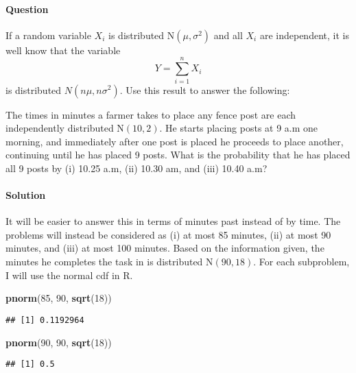 \documentclass[]{article}
\newenvironment{Shaded}{\begin{snugshade}}{\end{snugshade}}
\newcommand{\KeywordTok}[1]{\textcolor[rgb]{0.13,0.29,0.53}{\textbf{#1}}}
\newcommand{\DecValTok}[1]{\textcolor[rgb]{0.00,0.00,0.81}{#1}}
\newcommand{\NormalTok}[1]{#1}
\let\oldparagraph\paragraph
\renewcommand{\paragraph}[1]{\oldparagraph{#1}\mbox{}}
\begin{document}
\paragraph{Question}\label{question-5}

If a random variable \(X_i\) is distributed N\((\mu, \sigma^2)\) and all
\(X_i\) are independent, it is well know that the variable \[
        Y = \sum^n_{i=1}X_i
    \] is distributed \(N(n\mu, n\sigma^2).\) Use this result to answer
the following:

The times in minutes a farmer takes to place any fence post are each
independently distributed N\((10,2)\). He starts placing posts at 9 a.m
one morning, and immediately after one post is placed he proceeds to
place another, continuing until he has placed 9 posts. What is the
probability that he has placed all 9 posts by (i) 10.25 a.m, (ii) 10.30
am, and (iii) 10.40 a.m?

\paragraph{Solution}\label{solution-5}

It will be easier to answer this in terms of minutes past instead of by
time. The problems will instead be considered as (i) at most 85 minutes,
(ii) at most 90 minutes, and (iii) at most 100 minutes. Based on the
information given, the minutes he completes the task in is distributed
N\((90, 18)\). For each subproblem, I will use the normal cdf in R.

\begin{Shaded}
\begin{Highlighting}[]
\KeywordTok{pnorm}\NormalTok{(}\DecValTok{85}\NormalTok{, }\DecValTok{90}\NormalTok{, }\KeywordTok{sqrt}\NormalTok{(}\DecValTok{18}\NormalTok{))}
\end{Highlighting}
\end{Shaded}

\begin{verbatim}
## [1] 0.1192964
\end{verbatim}

\begin{Shaded}
\begin{Highlighting}[]
\KeywordTok{pnorm}\NormalTok{(}\DecValTok{90}\NormalTok{, }\DecValTok{90}\NormalTok{, }\KeywordTok{sqrt}\NormalTok{(}\DecValTok{18}\NormalTok{))}
\end{Highlighting}
\end{Shaded}

\begin{verbatim}
## [1] 0.5
\end{verbatim}
\end{document}
